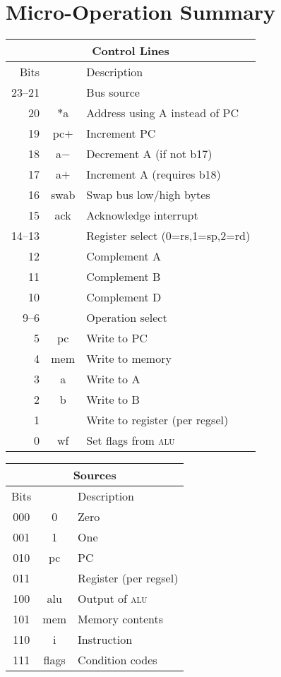 \documentclass[11pt]{book}
\begin{document}

\chapter{Micro-Operation Summary}
\begin{multicols}{2}\noindent
\begin{tabular}{rcl}
  \toprule
  \multicolumn{3}{c}{\textbf{Control Lines}}\\\midrule
  Bits&&Description\\\midrule
  23--21&&Bus source\\
  20&\(\ast\)a&Address using A instead of PC\\
  19&pc\(+\)&Increment PC\\
  18&a\(-\)&Decrement A (if not b17)\\
  17&a\(+\)&Increment A (requires b18)\\
  16&swab&Swap bus low/high bytes\\
  15&ack&Acknowledge interrupt\\
  14--13&&Register select (0=rs,1=sp,2=rd)\\
  12&&Complement A\\
  11&&Complement B\\
  10&&Complement D\\
  9--6&&Operation select\\
  5&pc&Write to PC\\
  4&mem&Write to memory\\
  3&a&Write to A\\
  2&b&Write to B\\
  1&&Write to register (per regsel)\\
  0&wf&Set flags from \textsc{alu}\\\bottomrule
\end{tabular}

\vspace{\baselineskip}\noindent
\begin{tabular}{ccl}
  \toprule
  \multicolumn{3}{c}{\textbf{Sources}}\\\midrule
  Bits&&Description\\\midrule
  000&0&Zero\\
  001&1&One\\
  010&pc&PC\\
  011&&Register (per regsel)\\
  100&alu&Output of \textsc{alu}\\
  101&mem&Memory contents\\
  110&i&Instruction\\
  111&flags&Condition codes\\
  \bottomrule
\end{tabular}


\end{multicols}
\end{document}
